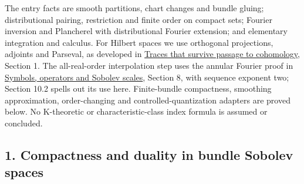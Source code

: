 \documentclass[
  11pt,
]{article}
\makeatletter
\let\ReaderOriginalAnchorStart\hyper@anchorstart
\let\ReaderOriginalAnchorEnd\hyper@anchorend
\let\ReaderPendingAliases\@empty
\def\ReaderArmAliases#1{\gdef\ReaderPendingAliases{#1}}
\def\hyper@anchorstart#1{\ReaderIfNativeAnchorTF{#1}{\ReaderPendingAliases\global\let\ReaderPendingAliases\@empty}{}\ReaderOriginalAnchorStart{#1}}
\makeatother
\begin{document}
The entry facts are smooth partitions, chart changes and bundle gluing;
distributional pairing, restriction and finite order on compact sets;
Fourier inversion and Plancherel with distributional Fourier extension;
and elementary integration and calculus. For Hilbert spaces we use
orthogonal projections, adjoints and Parseval, as developed in
\href{traces-and-complexes.pdf}{Traces that survive passage to
cohomology}, Section 1. The all-real-order interpolation step uses the
annular Fourier proof in \href{euclidean-symbol-calculus.pdf}{Symbols,
operators and Sobolev scales}, Section 8, with sequence exponent two;
Section 10.2 spells out its use here. Finite-bundle compactness,
smoothing approximation, order-changing and controlled-quantization
adapters are proved below. No K-theoretic or characteristic-class index
formula is assumed or concluded.

\ReaderArmAliases{\ReaderOriginalAnchorStart{AN03-GSI-001}\ReaderOriginalAnchorEnd\begingroup\expandafter\def\csname @currentHref\endcsname{AN03-GSI-001}\label{AN03-GSI-001}\endgroup\ReaderOriginalAnchorStart{an03-gsi-001-compactness-and-duality-in-bundle-sobolev-spaces}\ReaderOriginalAnchorEnd\begingroup\expandafter\def\csname @currentHref\endcsname{an03-gsi-001-compactness-and-duality-in-bundle-sobolev-spaces}\label{an03-gsi-001-compactness-and-duality-in-bundle-sobolev-spaces}\endgroup\ReaderOriginalAnchorStart{1-compactness-and-duality-in-bundle-sobolev-spaces}\ReaderOriginalAnchorEnd\begingroup\expandafter\def\csname @currentHref\endcsname{1-compactness-and-duality-in-bundle-sobolev-spaces}\label{1-compactness-and-duality-in-bundle-sobolev-spaces}\endgroup}
\subsection{1. Compactness and duality in bundle Sobolev
spaces}\label{compactness-and-duality-in-bundle-sobolev-spaces}
\end{document}
